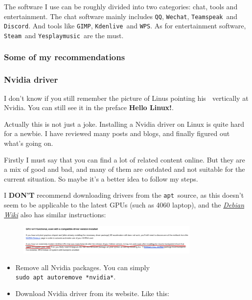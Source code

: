 \documentclass[12pt]{ctexart}
\newenvironment{mdquote}
{%
  \par\noindent
  \begin{list}{}{%
      \setlength{\leftmargin}{1em}%
      \setlength{\rightmargin}{0pt}%
      \setlength{\itemindent}{0pt}%
      \setlength{\listparindent}{\parindent}%
      \setlength{\topsep}{0.5\baselineskip}%
  }
  \item[\textbf{>}\ ]\itshape
}
{\end{list}\par}
\begin{document}
The software I use can be roughly divided into two categories: chat,
tools and entertainment. The chat software mainly includes \texttt{QQ},
\texttt{Wechat}, \texttt{Teamspeak}\ and \texttt{Discord}. And tools like
\texttt{GIMP}, \texttt{Kdenlive}\ and \texttt{WPS}. As for entertainment
software, \texttt{Steam}\ and \texttt{Yesplaymusic}\ are the must.

\subsubsection{\textbf{Some of my recommendations}}

\subsubsection*{\textbf{Nvidia driver}}

I don't know if you still remember the picture of Linus
pointing his 🖕 vertically at Nvidia. You can still see it in the
preface \textbf{Hello Linux!}.

Actually this is not just a joke. Installing a Nvidia driver on Linux is
quite hard for a newbie. I have reviewed many posts and blogs, and
finally figured out what's going on.

Firstly I must say that you can find a lot of related content online.
But they are a mix of good and bad, and many of them are outdated and
not suitable for the current situation. So maybe it's a
better idea to follow my steps.

\begin{mdquote}
I \textbf{DON'T} recommend downloading drivers from the
\texttt{apt}\ source, as this doesn't seem to be
applicable to the latest GPUs (such as 4060 laptop), and the
\href{https://wiki.debian.org/NvidiaGraphicsDrivers}{\textit{Debian Wiki}} also
has similar instructions:
\end{mdquote}

\begin{figure}[H]
    \centering
    \includegraphics[width=0.8\textwidth,keepaspectratio]{assets/Linux/3.2 Decorate your own garden/2.png}
\end{figure}

\begin{itemize}
\item
  Remove all Nvidia packages. You can simply
  \texttt{sudo\ apt\ autoremove\ *nvidia*}.
\item
  Download Nvidia driver from its website. Like this:
\end{itemize}
\end{document}
